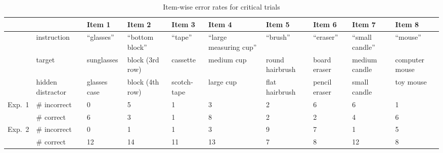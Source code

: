 \documentclass[10pt,letterpaper]{article}
\begin{document}
\begin{table}
\begin{center}
\begin{tabular}{ m{.75cm} | m{1.5cm} | m{1.5cm} | m{1.5cm} |  m{1.25cm} | m{1.6cm} | m{1.4cm} | m{1.3cm} | m{1.3cm} | m{1.5cm} |}
& & Item 1 & Item 2 & Item 3 & Item 4 & Item 5 & Item 6 & Item 7 & Item 8\\\hline
& instruction & ``glasses'' & ``bottom block'' & ``tape'' & ``large measuring cup'' & ``brush'' & ``eraser'' & ``small candle'' & ``mouse'' \\\hline
& target & sunglasses & block (3rd row) & cassette & medium cup & round hairbrush & board eraser & medium candle & computer mouse \\\hline
& hidden distractor & glasses case & block (4th row) & scotch-tape & large cup & flat \,\,\,hairbrush & pencil eraser & small candle & toy mouse \\
 \hline\hline
\multirow{2}{.75cm}{Exp.~1}  & \# incorrect & 0 & 5 & 1 & 3 & 2 &6 & 6 & 1 \\ 
                                               & \# correct & 6 & 3 & 1 & 8 & 2 & 2 & 4 & 6 \\
 \hline\hline
\multirow{2}{.75cm}{Exp.~2} & \# incorrect & 0 & 1 & 1 & 3 & 9 & 7 & 1 & 5 \\
                                              & \# correct   & 12&14&11&13&7 &8   &12& 8 \\

\end{tabular}
\caption{Item-wise error rates for critical trials}
\label{table:ItemWise}
\end{center}
\end{table}
\end{document}
